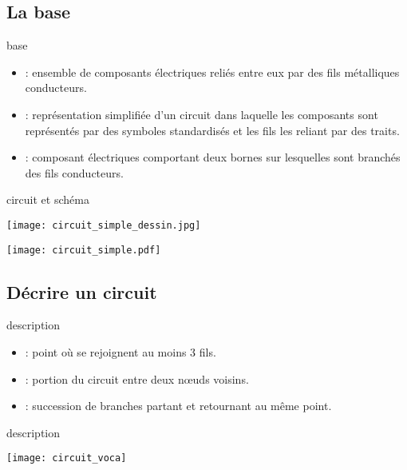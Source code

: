 \documentclass[../main/main.tex]{subfiles}
\begin{document}
\subsection{La base}
\begin{tcbraster}[raster columns=2, raster equal height=rows]
    \begin{defi}[label=def:circuits]{base}

        \begin{itemize}[leftmargin=100pt]
            \item[\textbf{Circuit électrique}]: ensemble de composants
                électriques reliés entre eux par des fils métalliques
                conducteurs.
            \item[\textbf{Schéma électrique}]: représentation simplifiée d'un
                circuit dans laquelle les composants sont représentés par des
                symboles standardisés et les fils les reliant par des traits.
            \item[\textbf{Dipôle}]: composant électriques comportant deux bornes
                sur lesquelles sont branchés des fils conducteurs.
        \end{itemize}
    \end{defi}
    \begin{exem}[label=exem:circuits]{circuit et schéma}
        \begin{center}
            \texttt{[image: circuit\_simple\_dessin.jpg]}
        \end{center}
        \tcblower
        \begin{center}
            \texttt{[image: circuit\_simple.pdf]}
        \end{center}
    \end{exem}
\end{tcbraster}

\subsection{Décrire un circuit}
\begin{tcbraster}[raster columns=2, raster equal height=rows]
    
    \begin{defi}[label=def:descri]{description}
        \begin{itemize}[leftmargin=50pt]
            \item[\textbf{Nœud}]: point où se rejoignent au moins 3 fils.
            \item[\textbf{Branche}]: portion du circuit entre deux nœuds
                voisins.
            \item[\textbf{Maille}]: succession de branches partant et retournant
                au même point.
        \end{itemize}
    \end{defi}
    \begin{exem}[label=exem:descri]{description}
        \begin{center}
            \texttt{[image: circuit\_voca]}
        \end{center}
    \end{exem}
\end{tcbraster}
\end{document}
